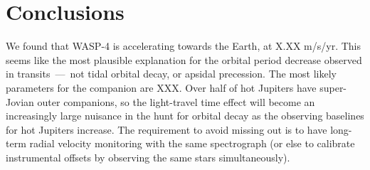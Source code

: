 \documentclass[12pt,twocolumn,tighten]{aastex62}
\begin{document}
\section{Conclusions}
\label{sec:conclusions}

We found that WASP-4 is accelerating towards the Earth, at
X.XX m/s/yr.
This seems like the most plausible explanation for the orbital 
period decrease observed in transits~---~not tidal
orbital decay, or apsidal precession.
The most likely parameters for the companion are XXX.
Over half of hot Jupiters have super-Jovian outer companions,
so the light-travel time effect will become an increasingly large nuisance in
the hunt for orbital decay as
the observing baselines for hot Jupiters increase.
The requirement to avoid missing out is to have long-term
radial velocity monitoring with the same spectrograph (or else to
calibrate instrumental offsets by observing the same stars simultaneously).




%
%
\end{document}
